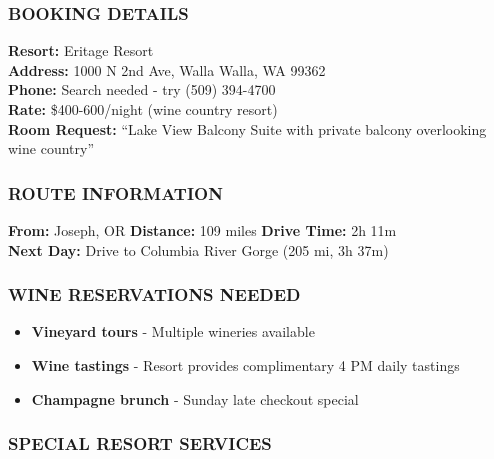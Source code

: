 \documentclass[
  11pt,
]{article}
\providecommand{\tightlist}{%
  \setlength{\itemsep}{0pt}\setlength{\parskip}{0pt}}
\begin{document}
\subsubsection{\texorpdfstring{\textcolor{primary}{BOOKING DETAILS}}{}}\label{section-34}

\textbf{\textcolor{secondary}{Resort:}} Eritage Resort\\
\textbf{\textcolor{secondary}{Address:}} 1000 N 2nd Ave, Walla Walla, WA
99362\\
\textbf{\textcolor{secondary}{Phone:}} Search needed - try (509)
394-4700\\
\textbf{\textcolor{secondary}{Rate:}} \$400-600/night (wine country
resort)\\
\textbf{\textcolor{secondary}{Room Request:}} ``Lake View Balcony Suite
with private balcony overlooking wine country''

\subsubsection{\texorpdfstring{\textcolor{primary}{ROUTE INFORMATION}}{}}\label{section-35}

\textbf{\textcolor{secondary}{From:}} Joseph, OR \textbar{}
\textbf{\textcolor{secondary}{Distance:}} 109 miles \textbar{}
\textbf{\textcolor{secondary}{Drive Time:}} 2h 11m\\
\textbf{\textcolor{secondary}{Next Day:}} Drive to Columbia River Gorge
(205 mi, 3h 37m)

\subsubsection{\texorpdfstring{\textcolor{primary}{WINE RESERVATIONS NEEDED}}{}}\label{section-36}

\begin{itemize}
\tightlist
\item
  \textbf{\textcolor{secondary}{Vineyard tours}} - Multiple wineries
  available
\item
  \textbf{\textcolor{secondary}{Wine tastings}} - Resort provides
  complimentary 4 PM daily tastings\\
\item
  \textbf{\textcolor{secondary}{Champagne brunch}} - Sunday late
  checkout special
\end{itemize}

\subsubsection{\texorpdfstring{\textcolor{primary}{SPECIAL RESORT SERVICES}}{}}\label{section-37}
\end{document}
